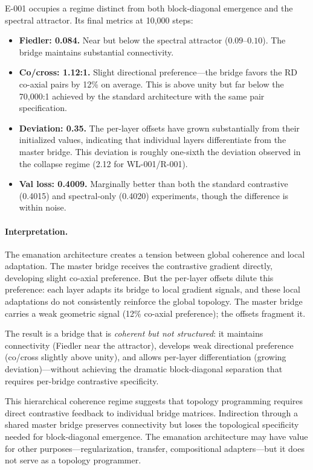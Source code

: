 E-001 occupies a regime distinct from both block-diagonal emergence
and the spectral attractor. Its final metrics at 10{,}000 steps:

\begin{itemize}
  \item \textbf{Fiedler: 0.084.} Near but below the spectral attractor
    ($0.09$--$0.10$). The bridge maintains substantial connectivity.
  \item \textbf{Co/cross: 1.12:1.} Slight directional preference---the
    bridge favors the RD co-axial pairs by 12\% on average. This is
    above unity but far below the 70{,}000:1 achieved by the standard
    architecture with the same pair specification.
  \item \textbf{Deviation: 0.35.} The per-layer offsets have grown
    substantially from their initialized values, indicating that
    individual layers differentiate from the master bridge. This
    deviation is roughly one-sixth the deviation observed in the
    collapse regime (2.12 for WL-001/R-001).
  \item \textbf{Val loss: 0.4009.} Marginally better than both the
    standard contrastive (0.4015) and spectral-only (0.4020)
    experiments, though the difference is within noise.
\end{itemize}

\paragraph{Interpretation.}
The emanation architecture creates a tension between global coherence
and local adaptation. The master bridge receives the contrastive
gradient directly, developing slight co-axial preference. But the
per-layer offsets dilute this preference: each layer adapts its bridge
to local gradient signals, and these local adaptations do not
consistently reinforce the global topology. The master bridge carries
a weak geometric signal (12\% co-axial preference); the offsets
fragment it.

The result is a bridge that is \emph{coherent but not structured}:
it maintains connectivity (Fiedler near the attractor), develops weak
directional preference (co/cross slightly above unity), and allows
per-layer differentiation (growing deviation)---without achieving the
dramatic block-diagonal separation that requires per-bridge
contrastive specificity.

This hierarchical coherence regime suggests that topology
programming requires direct contrastive feedback to individual
bridge matrices. Indirection through a shared master bridge preserves
connectivity but loses the topological specificity needed for
block-diagonal emergence. The emanation architecture may have value
for other purposes---regularization, transfer, compositional
adapters---but it does not serve as a topology programmer.

